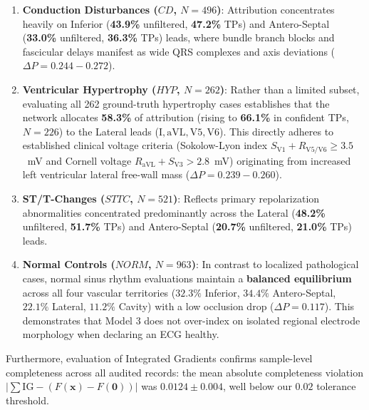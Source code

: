 \documentclass[12pt]{elsarticle}
\begin{document}
\begin{enumerate}
    This confirms per-patient anatomical attribution concordance against verified clinical sub-diagnoses.
    \item \textbf{Conduction Disturbances ($CD$, $N=496$)}: Attribution concentrates heavily on Inferior (\textbf{43.9\%} unfiltered, \textbf{47.2\%} TPs) and Antero-Septal (\textbf{33.0\%} unfiltered, \textbf{36.3\%} TPs) leads, where bundle branch blocks and fascicular delays manifest as wide QRS complexes and axis deviations ($\Delta P = 0.244-0.272$).
    \item \textbf{Ventricular Hypertrophy ($HYP$, $N=262$)}: Rather than a limited subset, evaluating all 262 ground-truth hypertrophy cases establishes that the network allocates \textbf{58.3\%} of attribution (rising to \textbf{66.1\%} in confident TPs, $N=226$) to the Lateral leads ($\text{I}, \text{aVL}, \text{V5}, \text{V6}$). This directly adheres to established clinical voltage criteria (Sokolow-Lyon index $S_{\text{V1}} + R_{\text{V5/V6}} \ge 3.5$~mV and Cornell voltage $R_{\text{aVL}} + S_{\text{V3}} > 2.8$~mV) originating from increased left ventricular lateral free-wall mass ($\Delta P = 0.239-0.260$).
    \item \textbf{ST/T-Changes ($STTC$, $N=521$)}: Reflects primary repolarization abnormalities concentrated predominantly across the Lateral (\textbf{48.2\%} unfiltered, \textbf{51.7\%} TPs) and Antero-Septal (\textbf{20.7\%} unfiltered, \textbf{21.0\%} TPs) leads.
    \item \textbf{Normal Controls ($NORM$, $N=963$)}: In contrast to localized pathological cases, normal sinus rhythm evaluations maintain a \textbf{balanced equilibrium} across all four vascular territories ($32.3\%$ Inferior, $34.4\%$ Antero-Septal, $22.1\%$ Lateral, $11.2\%$ Cavity) with a low occlusion drop ($\Delta P = 0.117$). This demonstrates that Model 3 does not over-index on isolated regional electrode morphology when declaring an ECG healthy.
\end{enumerate}

Furthermore, evaluation of Integrated Gradients confirms sample-level completeness across all audited records: the mean absolute completeness violation $|\sum \text{IG} - (F(\mathbf{x}) - F(\mathbf{0}))|$ was $0.0124 \pm 0.004$, well below our $0.02$ tolerance threshold.
\end{document}
